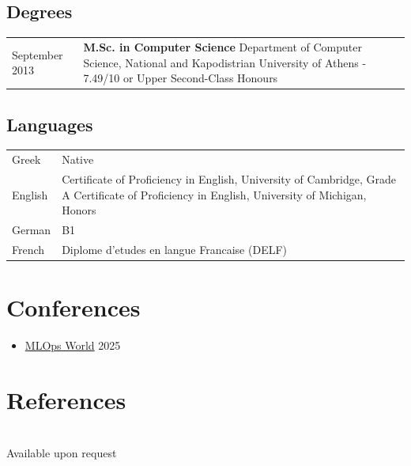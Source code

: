 \documentclass{article}
\begin{document}
    \subsection*{Degrees}
    \begin{tabular}{p{2cm}  p{12cm}}
        \small September 2013 & \textbf{M.Sc. in Computer Science} \newline
            Department of Computer Science, National and Kapodistrian University of Athens - 7.49/10 or Upper Second-Class Honours
    \end{tabular}

    \subsection*{Languages}
        \begin{tabular}{p{2cm}  p{12cm}}
            Greek & Native \\
            English & Certificate of Proficiency in English, University of Cambridge, Grade A \newline
                            Certificate of Proficiency in English, University of Michigan, Honors \\
            German & B1 \\
            French & Diplome d’etudes en langue Francaise (DELF) 
        \end{tabular}

        \section*{\color{NavyBlue}Conferences}
        \vspace{-0.5cm}
    {\color{NavyBlue} \hrulefill}
        \begin{itemize}[label=\raisebox{0.25ex}{\tiny$\bullet$}, leftmargin=1.5em, labelsep=0.3em]
            \item \href{https://mlopsworld.com/}{MLOps World} 2025 
        \end{itemize}
    \section*{\color{NavyBlue}References}
    \vspace{-0.5cm}
    {\color{NavyBlue}\hrulefill} \\
    Available upon request
\end{document}
